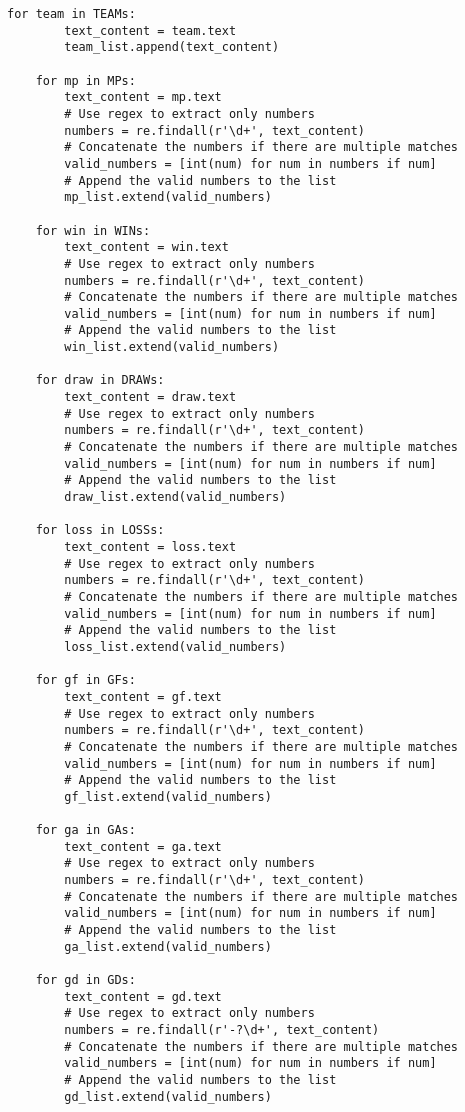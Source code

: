 \begin{lstlisting}[style=pystyle]
    for team in TEAMs:
        text_content = team.text
        team_list.append(text_content)

    for mp in MPs:
        text_content = mp.text
        # Use regex to extract only numbers
        numbers = re.findall(r'\d+', text_content)
        # Concatenate the numbers if there are multiple matches
        valid_numbers = [int(num) for num in numbers if num]
        # Append the valid numbers to the list
        mp_list.extend(valid_numbers)

    for win in WINs:
        text_content = win.text
        # Use regex to extract only numbers
        numbers = re.findall(r'\d+', text_content)
        # Concatenate the numbers if there are multiple matches
        valid_numbers = [int(num) for num in numbers if num]
        # Append the valid numbers to the list
        win_list.extend(valid_numbers)

    for draw in DRAWs:
        text_content = draw.text
        # Use regex to extract only numbers
        numbers = re.findall(r'\d+', text_content)
        # Concatenate the numbers if there are multiple matches
        valid_numbers = [int(num) for num in numbers if num]
        # Append the valid numbers to the list
        draw_list.extend(valid_numbers)

    for loss in LOSSs:
        text_content = loss.text
        # Use regex to extract only numbers
        numbers = re.findall(r'\d+', text_content)
        # Concatenate the numbers if there are multiple matches
        valid_numbers = [int(num) for num in numbers if num]
        # Append the valid numbers to the list
        loss_list.extend(valid_numbers)

    for gf in GFs:
        text_content = gf.text
        # Use regex to extract only numbers
        numbers = re.findall(r'\d+', text_content)
        # Concatenate the numbers if there are multiple matches
        valid_numbers = [int(num) for num in numbers if num]
        # Append the valid numbers to the list
        gf_list.extend(valid_numbers)

    for ga in GAs:
        text_content = ga.text
        # Use regex to extract only numbers
        numbers = re.findall(r'\d+', text_content)
        # Concatenate the numbers if there are multiple matches
        valid_numbers = [int(num) for num in numbers if num]
        # Append the valid numbers to the list
        ga_list.extend(valid_numbers)

    for gd in GDs:
        text_content = gd.text
        # Use regex to extract only numbers
        numbers = re.findall(r'-?\d+', text_content)
        # Concatenate the numbers if there are multiple matches
        valid_numbers = [int(num) for num in numbers if num]
        # Append the valid numbers to the list
        gd_list.extend(valid_numbers)


\end{lstlisting}
